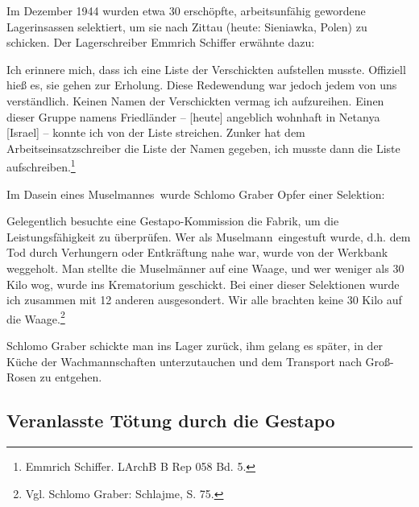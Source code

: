 \documentclass[a4paper,12pt,ngerman,
]{nisebook}
\begin{document}
Im Dezember 1944 wurden etwa 30 erschöpfte, arbeitsunfähig gewordene Lagerinsassen\label{widerstand_schiffer} \glqq selektiert\grqq, um sie nach Zittau (heute: Sieniawka, Polen) zu schicken. Der Lagerschreiber Emmrich Schiffer erwähnte dazu:
\begin{leftbar}
Ich erinnere mich, dass ich eine Liste der Verschickten aufstellen musste. Offiziell hieß es, sie gehen zur Erholung. Diese Redewendung war jedoch jedem von uns verständlich. Keinen Namen der Verschickten vermag ich aufzureihen. Einen dieser Gruppe namens Friedländer -- [heute] angeblich wohnhaft in Netanya [Israel] -- konnte ich von der Liste streichen. Zunker hat dem Arbeitseinsatzschreiber die Liste der Namen gegeben, ich musste dann die Liste aufschreiben.\footnote{Emmrich Schiffer. LArchB B Rep 058 Bd. 5.}
\end{leftbar}

Im Dasein eines \glqq Muselmannes\grqq~wurde Schlomo Graber Opfer einer \glqq Selektion\grqq:
\begin{leftbar}
Gelegentlich besuchte eine Gestapo-Kommission die Fabrik, um die Leistungsfähigkeit zu überprüfen. Wer als \glqq Muselmann\grqq~eingestuft wurde, d.h. dem Tod durch Verhungern oder Entkräftung nahe war, wurde von der Werkbank weggeholt. Man stellte die Muselmänner auf eine Waage, und wer weniger als 30 Kilo wog, wurde ins Krematorium geschickt. Bei einer dieser Selektionen wurde ich zusammen mit 12 anderen ausgesondert. Wir alle brachten keine 30 Kilo auf die Waage.\footnote{Vgl. Schlomo Graber: Schlajme, S. 75.}
\end{leftbar}
Schlomo Graber schickte man ins Lager zurück, ihm gelang es später, in der Küche der Wachmannschaften unterzutauchen und dem Transport nach Groß-Rosen zu entgehen.



\subsection{Veranlasste Tötung durch die Gestapo}
\end{document}
